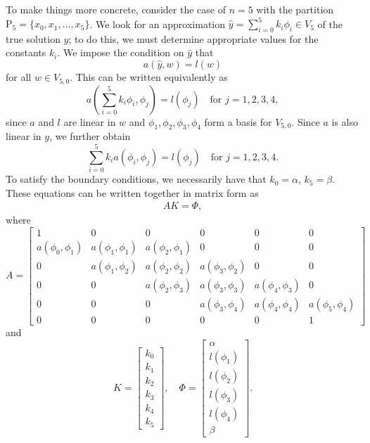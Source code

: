 To make things more concrete, consider the case of \(n=5\) with the partition $\mathrm{P}_5 = \{x_0, x_1, \ldots, x_5\}$.
We look for an approximation $\hat{y} = \sum_{i=0}^5 k_i \phi_i \in V_5$ of the true solution $y$; to do this, we must determine appropriate values for the constants $k_i$.
We impose the condition on $\hat{y}$ that 
\[a(\hat{y},w) = l(w)\]
for all \(w \in V_{5,0}\).
This can be written equivalently as 
\[a \left( \sum_{i=0}^5 k_i \phi_i,\phi_j \right) = l(\phi_j) \quad \text{for } j = 1,2,3,4,\]
since \(a\) and \(l\) are linear in \(w\) and $\phi_1, \phi_2, \phi_3, \phi_4$ form a basis for $V_{5,0}$.
Since $a$ is also linear in \(y\), we further obtain 
\[\sum_{i=0}^5 k_i  a ( \phi_i,\phi_j ) = l(\phi_j) \quad \text{for } j = 1,2,3,4.\]
To satisfy the boundary conditions, we necessarily have that $k_0 = \alpha$, $k_5 = \beta$.
These equations can be written together in matrix form as
\begin{align} AK = \Phi,\label{eqn:FEM_linear_system}\end{align}
where
\[A = \left[\begin{array}{cccccc}1 & 0 & 0 & 0 & 0 & 0 \\a(\phi_0,\phi_1) & a(\phi_1,\phi_1) & a(\phi_2,\phi_1) & 0 & 0 & 0 \\0 & a(\phi_1,\phi_2) & a(\phi_2,\phi_2) & a(\phi_3,\phi_2) & 0 & 0 \\0 & 0 & a(\phi_2,\phi_3) & a(\phi_3,\phi_3) & a(\phi_4,\phi_3) & 0 \\0 & 0 & 0 & a(\phi_3,\phi_4) & a(\phi_4,\phi_4) & a(\phi_5,\phi_4) \\0 & 0 & 0 & 0 & 0 &1\end{array}\right]\]
and
\[K = \left[\begin{array}{c}k_0 \\k_1 \\k_2 \\k_3 \\k_4 \\k_5\end{array}\right] , \quad\Phi =  \left[\begin{array}{c}\alpha \\l(\phi_1) \\l(\phi_2) \\l(\phi_3) \\l(\phi_4) \\\beta\end{array}\right].\]

